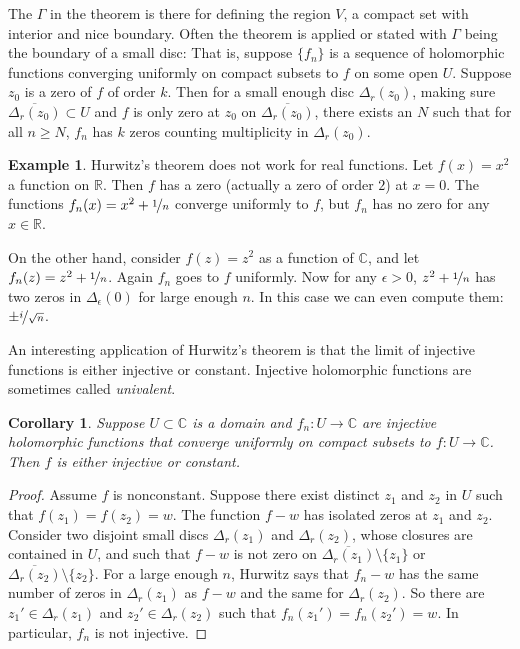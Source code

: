 \documentclass[12pt,openany]{book}
\newcommand{\C}{{\mathbb{C}}}
\newcommand{\R}{{\mathbb{R}}}
\newcommand{\myindex}[1]{#1\index{#1}}
\theoremstyle{plain}
\newtheorem{cor}[thm]{Corollary}
\theoremstyle{remark}
\theoremstyle{definition}
\theoremstyle{exercise}
\theoremstyle{example}
\newtheorem{example}[thm]{Example}
\begin{document}
The $\Gamma$ in the theorem is there for defining the region
$V$, a compact set with interior and nice boundary.
Often the theorem is applied or stated with $\Gamma$ being
the boundary of a small disc:
That is, suppose $\{ f_n \}$ is a sequence of holomorphic
functions converging uniformly
on compact subsets to $f$ on some open $U$.  Suppose $z_0$ is a zero of
$f$ of order $k$.  Then for a small enough disc $\Delta_r(z_0)$,
making sure $\overline{\Delta_r(z_0)} \subset U$ and
$f$ is only zero at $z_0$ on $\overline{\Delta_r(z_0)}$,
there exists an $N$ such that
for all $n \geq N$, $f_n$ has $k$ zeros counting multiplicity in
$\Delta_r(z_0)$.

\begin{example}
Hurwitz's theorem does not work for real functions.  Let $f(x) =
x^2$ a function on $\R$.  Then $f$ has a zero (actually a zero of order $2$)
at $x=0$.  The functions $f_n(x) = x^2+\nicefrac{1}{n}$ converge uniformly
to $f$, but $f_n$ has no zero for any $x \in \R$.

On the other hand, consider $f(z) = z^2$ as a function of $\C$, and let
$f_n(z) = z^2+\nicefrac{1}{n}$.  Again $f_n$ goes to $f$ uniformly.  Now for
any $\epsilon > 0$, $z^2+\nicefrac{1}{n}$ has
two zeros in $\Delta_\epsilon(0)$ for large enough $n$.  In this case we can even compute
them: $\pm \nicefrac{i}{\sqrt{n}}$.
\end{example}

An interesting application of Hurwitz's theorem is that the limit of
injective functions is either injective or constant.
Injective holomorphic
functions are sometimes called \emph{\myindex{univalent}}.

\begin{cor} \label{cor:univalentlimit}
Suppose $U \subset \C$ is a domain and $f_n \colon U \to \C$ are
injective holomorphic functions that converge uniformly on compact subsets
to $f \colon U \to \C$.  Then $f$ is either injective or constant.
\end{cor}

\begin{proof}
Assume $f$ is nonconstant.
Suppose there exist distinct $z_1$ and $z_2$ in $U$ such that $f(z_1) =
f(z_2) = w$.  The function $f-w$ has isolated zeros at $z_1$ and $z_2$.
Consider two disjoint small discs $\Delta_r(z_1)$ and $\Delta_r(z_2)$,
whose closures are contained in $U$,
and such that $f-w$ is not zero on
$\overline{\Delta_r(z_1)} \setminus \{ z_1 \}$ or
$\overline{\Delta_r(z_2)} \setminus \{ z_2 \}$.
For a large enough $n$, Hurwitz says that $f_n-w$ has the same number of
zeros in $\Delta_r(z_1)$ as $f-w$ and the same for $\Delta_r(z_2)$.
So there are $z_1' \in \Delta_r(z_1)$ and
$z_2' \in \Delta_r(z_2)$ such that $f_n(z_1')=f_n(z_2')=w$.
In particular, $f_n$ is not injective.
\end{proof}
\end{document}
